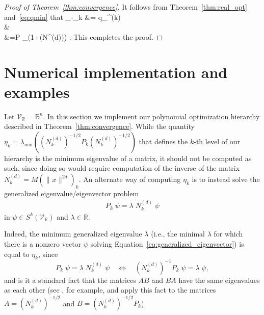 \documentclass[11pt]{article}
\numberwithin{theorem}{section}
\theoremstyle{definition}
\newcommand{\tinyspace}{\mspace{1mu}}
\newcommand{\norm}[1]{\lVert\tinyspace #1 \tinyspace\rVert}
\newcommand{\real}{\mathbb{R}}
\newcommand\V{\mathcal{V}}
\def\ba#1\ea{\begin{align}#1\end{align}}
\newcommand{\Vr}{\V_{\real}}
\begin{document}
\begin{proof}[Proof of Theorem~\ref{thm:convergence}]
It follows from Theorem~\ref{thm:real_opt} and~\eqref{eq:qmin} that
\ba
p_{\min}-\eta_k &= q_{\min}^{(k)}\\
 &\leq {} \\
 &=\norm{P}_{\infty}\left(1+\kappa(N^{(d)})\right) .
\ea
This completes the proof.
\end{proof}



\section{Numerical implementation and examples}\label{sec:numerics}

Let $\Vr=\real^n$. In this section we implement our polynomial optimization hierarchy described in Theorem~\ref{thm:convergence}. While the quantity $\eta_k=\lambda_{\min}((N_k^{(d)})^{-1/2}P_k (N_k^{(d)})^{-1/2})$ that defines the $k$-th level of our hierarchy is the minimum eigenvalue of a matrix, it should not be computed as such, since doing so would require computation of the inverse of the matrix $N_k^{(d)}=M(\norm{x}^{2d})_k$. %
An alternate way of computing $\eta_k$ is to instead solve the generalized eigenvalue/eigenvector problem
\begin{align}\label{eq:generalized_eigenvector}
    P_k \; \psi  = \lambda \; N_k^{(d)} \; \psi
\end{align}
in $\psi \in S^k(\Vr)$ and $\lambda \in \real$.

Indeed, the minimum generalized eigenvalue $\lambda$ (i.e., the minimal $\lambda$ for which there is a nonzero vector $\psi$ solving Equation~\eqref{eq:generalized_eigenvector}) is equal to $\eta_k$, since
\[
    P_k \; \psi  = \lambda \; N_k^{(d)} \; \psi \quad \Longleftrightarrow \quad (N_k^{(d)})^{-1}P_k\; \psi = \lambda \; \psi,
\]
and is it a standard fact that the matrices $AB$ and $BA$ have the same eigenvalues as each other (see \cite[Theorem~1.3.22]{HJ13}, for example, and apply this fact to the matrices $A = (N_k^{(d)})^{-1/2}$ and $B = (N_k^{(d)})^{-1/2}P_k$).
\end{document}
